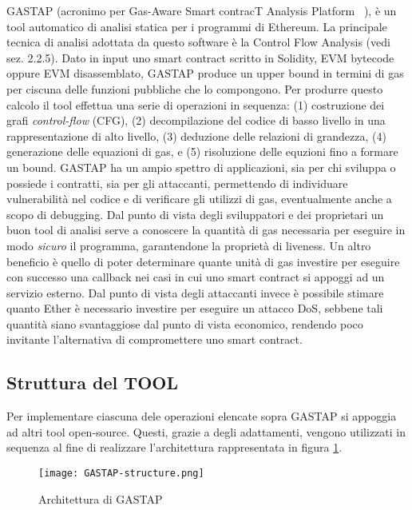 GASTAP (acronimo per Gas-Aware Smart contracT Analysis Platform ~\cite{DBLP:journals/corr/abs-1811-10403}), è un tool automatico di analisi statica per i programmi di Ethereum. La principale tecnica di analisi adottata da questo software è la Control Flow Analysis (vedi sez. 2.2.5).\newline
\indent Dato in input uno smart contract scritto in Solidity, EVM bytecode oppure EVM disassemblato, GASTAP produce un upper bound in termini di gas per ciscuna delle funzioni pubbliche che lo compongono. Per produrre questo calcolo il tool effettua una serie di operazioni in sequenza: (1) costruzione dei grafi \textit{control-flow} (CFG), (2) decompilazione del codice di basso livello in una rappresentazione di alto livello, (3) deduzione delle relazioni di grandezza, (4) generazione delle equazioni di gas, e (5) risoluzione delle equzioni fino a formare un bound.\newline
\indent GASTAP ha un ampio spettro di applicazioni, sia per chi sviluppa o possiede i contratti, sia per gli attaccanti, permettendo di individuare vulnerabilità nel codice e di verificare gli utilizzi di gas, eventualmente anche a scopo di debugging.
Dal punto di vista degli sviluppatori e dei proprietari un buon tool di analisi serve a conoscere la quantità di gas necessaria per eseguire in modo \textit{sicuro} il programma, garantendone la proprietà di liveness. Un altro beneficio è quello di poter determinare quante unità di gas investire per eseguire con successo una callback nei casi in cui uno smart contract si appoggi ad un servizio esterno.
Dal punto di vista degli attaccanti invece è possibile stimare quanto Ether è necessario investire per eseguire un attacco DoS, sebbene tali quantità siano svantaggiose dal punto di vista economico, rendendo poco invitante l'alternativa di compromettere uno smart contract.\newline

    \subsection{Struttura del TOOL}
    
    Per implementare ciascuna dele operazioni elencate sopra GASTAP si appoggia ad altri tool open-source. Questi, grazie a degli adattamenti, vengono utilizzati in sequenza al fine di realizzare l'architettura rappresentata in figura \ref{fig:gstp-struct}.\newline 
    
    \begin{figure}[h]
        \centering
        \texttt{[image: GASTAP-structure.png]}
        \caption{Architettura di GASTAP}
        \label{fig:gstp-struct}
    \end{figure}
    
